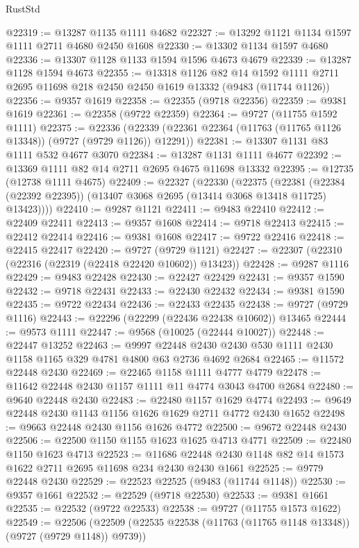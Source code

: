 \begin{lexlean}{RustStd}
\begin{coremodule}
@22319 := @13287 @1135 @1111 @4682
@22327 := @13292 @1121 @1134 @1597 @1111 @2711 @4680 @2450 @1608
@22330 := @13302 @1134 @1597 @4680
@22336 := @13307 @1128 @1133 @1594 @1596 @4673 @4679
@22339 := @13287 @1128 @1594 @4673
@22355 := @13318
    @1126
    @82
    @14
    @1592
    @1111
    @2711
    @2695
    @11698
    @218
    @2450
    @2450
    @1619
    @13332
    (@9483 (@11744 @1126))
@22356 := @9357 @1619
@22358 := @22355 (@9718 @22356)
@22359 := @9381 @1619
@22361 := @22358 (@9722 @22359)
@22364 := @9727 (@11755 @1592 @1111)
@22375 := @22336
    (@22339 (@22361 @22364 (@11763 (@11765 @1126 @13348)) (@9727 (@9729 @1126)) @12291))
@22381 := @13307 @1131 @83 @1111 @532 @4677 @3070
@22384 := @13287 @1131 @1111 @4677
@22392 := @13369 @1111 @82 @14 @2711 @2695 @4675 @11698 @13332
@22395 := @12735 (@12738 @1111 @4675)
@22409 := @22327
    (@22330
      (@22375
        (@22381 (@22384 (@22392 @22395)) (@13407 @3068 @2695 (@13414 @3068 @13418 @11725) @13423))))
@22410 := @9287 @1121
@22411 := @9483 @22410
@22412 := @22409 @22411
@22413 := @9357 @1608
@22414 := @9718 @22413
@22415 := @22412 @22414
@22416 := @9381 @1608
@22417 := @9722 @22416
@22418 := @22415 @22417
@22420 := @9727 (@9729 @1121)
@22427 := @22307 (@22310 (@22316 (@22319 (@22418 @22420 @10602)) @13423))
@22428 := @9287 @1116
@22429 := @9483 @22428
@22430 := @22427 @22429
@22431 := @9357 @1590
@22432 := @9718 @22431
@22433 := @22430 @22432
@22434 := @9381 @1590
@22435 := @9722 @22434
@22436 := @22433 @22435
@22438 := @9727 (@9729 @1116)
@22443 := @22296 (@22299 (@22436 @22438 @10602)) @13465
@22444 := @9573 @1111
@22447 := @9568 (@10025 (@22444 @10027))
@22448 := @22447 @13252
@22463 := @9997
    @22448
    @2430
    @2430
    @530
    @1111
    @2430
    @1158
    @1165
    @329
    @4781
    @4800
    @63
    @2736
    @4692
    @2684
@22465 := @11572 @22448 @2430
@22469 := @22465 @1158 @1111 @4777 @4779
@22478 := @11642 @22448 @2430 @1157 @1111 @11 @4774 @3043 @4700 @2684
@22480 := @9640 @22448 @2430
@22483 := @22480 @1157 @1629 @4774
@22493 := @9649 @22448 @2430 @1143 @1156 @1626 @1629 @2711 @4772 @2430 @1652
@22498 := @9663 @22448 @2430 @1156 @1626 @4772
@22500 := @9672 @22448 @2430
@22506 := @22500 @1150 @1155 @1623 @1625 @4713 @4771
@22509 := @22480 @1150 @1623 @4713
@22523 := @11686 @22448 @2430 @1148 @82 @14 @1573 @1622 @2711 @2695 @11698 @234 @2430 @2430 @1661
@22525 := @9779 @22448 @2430
@22529 := @22523 @22525 (@9483 (@11744 @1148))
@22530 := @9357 @1661
@22532 := @22529 (@9718 @22530)
@22533 := @9381 @1661
@22535 := @22532 (@9722 @22533)
@22538 := @9727 (@11755 @1573 @1622)
@22549 := @22506 (@22509 (@22535 @22538 (@11763 (@11765 @1148 @13348)) (@9727 (@9729 @1148)) @9739))

\end{coremodule}
\end{lexlean}
